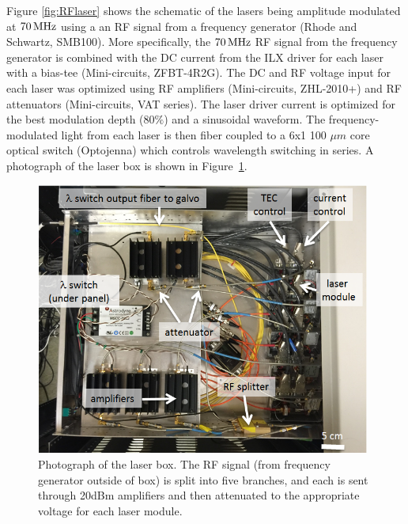 Figure \ref{fig:RFlaser} shows the schematic of the lasers being amplitude modulated at $70\,{\rm MHz}$ using a an RF signal from a frequency generator (Rhode and Schwartz, SMB100). More specifically, the $70\,{\rm MHz}$ RF signal from the frequency generator is combined with the DC current from the ILX driver for each laser with a bias-tee (Mini-circuits, ZFBT-4R2G). The DC and RF voltage input for each laser was optimized using RF amplifiers (Mini-circuits, ZHL-2010+) and RF attenuators (Mini-circuits, VAT series). The laser driver current is optimized for the best modulation depth ($80\%$) and a sinusoidal waveform. The frequency-modulated light from each laser is then fiber coupled to a 6x1 100 $\mu m$ core optical switch (Optojenna) which controls wavelength switching in series. A photograph of the laser box is shown in Figure~\ref{fig:laserbox}.
\begin{figure}[h]
\centering
\includegraphics[width=11cm]{./figures/4_Gen3/laserbox.png}
\caption[Photograph of the laser box]{Photograph of the laser box. The RF signal (from frequency generator outside of box) is split into five branches, and each is sent through 20dBm amplifiers and then attenuated to the appropriate voltage for each laser module.}
\label{fig:laserbox}
\end{figure}
